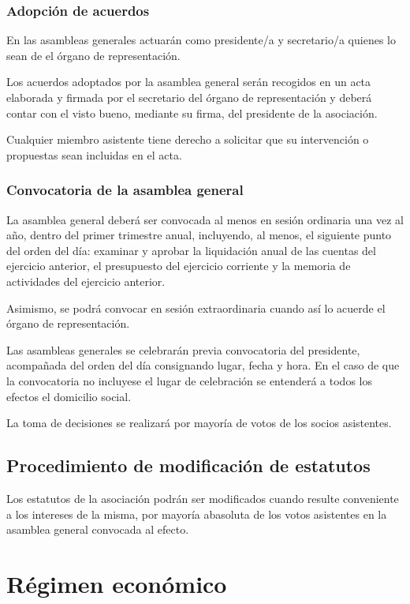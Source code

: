 \documentclass[a4paper, 12pt, oneside]{book}
\begin{document}
\subsection{Adopción de acuerdos}

En las asambleas generales actuarán como presidente/a y secretario/a quienes lo sean de el órgano de representación.

Los acuerdos adoptados por la asamblea general serán recogidos en un acta elaborada y firmada por el secretario del órgano de representación y deberá contar con el visto bueno, mediante su firma, del presidente de la asociación.

Cualquier miembro asistente tiene derecho a solicitar que su intervención o propuestas sean incluidas en el acta.

\subsection{Convocatoria de la asamblea general}

La asamblea general deberá ser convocada al menos en sesión ordinaria una vez al año, dentro del primer trimestre anual, incluyendo, al menos, el siguiente punto del orden del día: examinar y aprobar la liquidación anual de las cuentas del ejercicio anterior, el presupuesto del ejercicio corriente y la memoria de actividades del ejercicio anterior.

Asimismo, se podrá convocar en sesión extraordinaria cuando así lo acuerde el órgano de representación.

Las asambleas generales se celebrarán previa convocatoria del presidente, acompañada del orden del día consignando lugar, fecha y hora. En el caso de que la convocatoria no incluyese el lugar de celebración se entenderá a todos los efectos el domicilio social.

La toma de decisiones se realizará por mayoría de votos de los socios asistentes.

\section{Procedimiento de modificación de estatutos}

Los estatutos de la asociación podrán ser modificados cuando resulte conveniente a los intereses de la misma, por mayoría abasoluta de los votos asistentes en la asamblea general convocada al efecto.

\chapter{Régimen económico}
\end{document}

